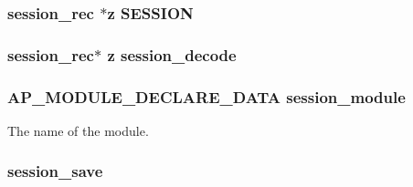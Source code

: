 \subsubsection[{\texorpdfstring{S\+E\+S\+S\+I\+ON}{SESSION}}]{ {\bf session\+\_\+rec} $\ast$z S\+E\+S\+S\+I\+ON}\hypertarget{group__MOD__SESSION_ga356e6480f30ba4f9ad049df5ef391cb0}{}\label{group__MOD__SESSION_ga356e6480f30ba4f9ad049df5ef391cb0}
\subsubsection[{\texorpdfstring{session\+\_\+decode}{session_decode}}]{ {\bf session\+\_\+rec}$\ast$ z session\+\_\+decode}\hypertarget{group__MOD__SESSION_ga07aa3887eead1c519d2441a9a2449c8c}{}\label{group__MOD__SESSION_ga07aa3887eead1c519d2441a9a2449c8c}
\subsubsection[{\texorpdfstring{session\+\_\+module}{session_module}}]{ {\bf A\+P\+\_\+\+M\+O\+D\+U\+L\+E\+\_\+\+D\+E\+C\+L\+A\+R\+E\+\_\+\+D\+A\+TA} session\+\_\+module}\hypertarget{group__MOD__SESSION_ga0788cae1e5b29614b9a1d976483a5c94}{}\label{group__MOD__SESSION_ga0788cae1e5b29614b9a1d976483a5c94}
The name of the module. 
\subsubsection[{\texorpdfstring{session\+\_\+save}{session_save}}]{\setlength{\rightskip}{0pt plus 5cm}session\+\_\+save}\hypertarget{group__MOD__SESSION_ga26d7816f280bd1e89cd6f2690e825dd1}{}\label{group__MOD__SESSION_ga26d7816f280bd1e89cd6f2690e825dd1}
